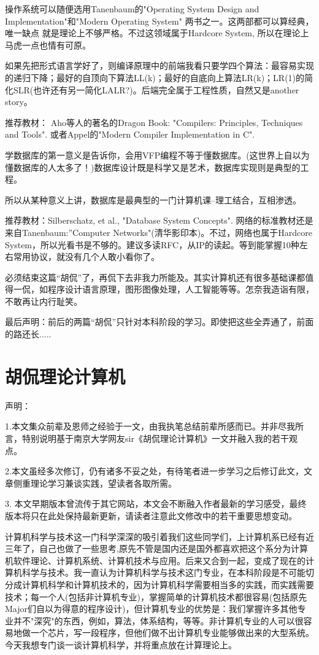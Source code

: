 操作系统可以随便选用Tanenbaum的"Operating System Design and Implementation"和"Modern Operating  System" 两书之一。这两部都可以算经典，唯一缺点 就是理论上不够严格。不过这领域属于Hardcore System, 所以在理论上马虎一点也情有可原。 

如果先把形式语言学好了，则编译原理中的前端我看只要学四个算法：最容易实现的递归下降；最好的自顶向下算法LL(k)；最好的自底向上算法LR(k)；LR(1)的简化SLR(也许还有另一简化LALR?)。后端完全属于工程性质，自然又是another story。 


推荐教材： Aho等人的著名的Dragon Book: "Compilers: Principles, Techniques and Tools". 或者Appel的"Modern Compiler Implementation in C". 

学数据库的第一意义是告诉你，会用VFP编程不等于懂数据库。(这世界上自以为懂数据库的人太多了！)数据库设计既是科学又是艺术，数据库实现则是典型的工程。 

所以从某种意义上讲，数据库是最典型的一门计算机课--理工结合，互相渗透。 

推荐教材：Silberschatz, et al., "Database System Concepts". 
网络的标准教材还是来自Tanenbaum:”Computer Networks"(清华影印本)。不过，网络也属于Hardcore System，所以光看书是不够的。建议多读RFC，从IP的读起。等到能掌握10种左右常用协议，就没有几个人敢小看你了。 

必须结束这篇“胡侃”了，再侃下去非我力所能及。其实计算机还有很多基础课都值得一侃，如程序设计语言原理，图形图像处理，人工智能等等。怎奈我造诣有限，不敢再让内行耻笑。 

最后声明：前后的两篇“胡侃”只针对本科阶段的学习。即使把这些全弄通了，前面的路还长.....


\chapter{胡侃理论计算机}


声明\cite{kinglear}： 

1.本文集众前辈及恩师之经验于一文，由我执笔总结前辈所感而已。并非尽我所言，特别说明基于南京大学网友sir《胡侃理论计算机》一文并融入我的若干观点。 

2.本文虽经多次修订，仍有诸多不妥之处，有待笔者进一步学习之后修订此文，文章侧重理论学习兼谈实践，望读者各取所需。 

3. 本文早期版本曾流传于其它网站，本文会不断融入作者最新的学习感受，最终版本将只在此处保持最新更新，请读者注意此文修改中的若干重要思想变动。 


计算机科学与技术这一门科学深深的吸引着我们这些同学们，上计算机系已经有近三年了，自己也做了一些思考,原先不管是国内还是国外都喜欢把这个系分为计算机软件理论、计算机系统、计算机技术与应用。后来又合到一起，变成了现在的计算机科学与技术。我一直认为计算机科学与技术这门专业，在本科阶段是不可能切分成计算机科学和计算机技术的，因为计算机科学需要相当多的实践，而实践需要技术；每一个人(包括非计算机专业)，掌握简单的计算机技术都很容易(包括原先Major们自以为得意的程序设计)，但计算机专业的优势是：我们掌握许多其他专业并不"深究"的东西，例如，算法，体系结构，等等。非计算机专业的人可以很容易地做一个芯片，写一段程序，但他们做不出计算机专业能够做出来的大型系统。今天我想专门谈一谈计算机科学，并将重点放在计算理论上。 

